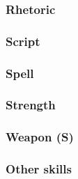 \subsubsection*{Rhetoric}   
\subsubsection*{Script}
\subsubsection*{Spell}
\subsubsection*{Strength}
\subsubsection*{Weapon (S)}
\subsubsection*{Other skills}